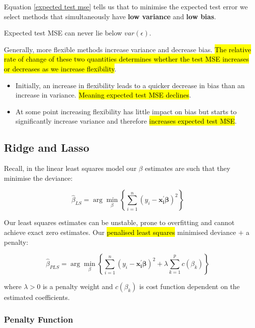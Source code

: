 \documentclass[11pt]{article}
\begin{document}
Equation \eqref{expected test mse} tells us that to minimise the expected test error we select methods that simultaneously have \textbf{low variance} and \textbf{low bias}.

\begin{note}
    Expected test MSE can never lie below $var(\epsilon)$.
\end{note}

Generally, more flexible methods increase variance and decrease bias. \hl{The relative rate of change of these two quantities determines whether the test MSE increases or decreases as we increase flexibility}.
\begin{itemize}
    \item Initially, an increase in flexibility leads to a quicker decrease in bias than an increase in variance. \hl{Meaning expected test MSE declines}.
    \item At some point increasing flexibility has little impact on bias but starts to significantly increase variance and therefore \hl{increases expected test MSE}.
\end{itemize}

\subsection{Ridge and Lasso}

Recall, in the linear least squares model our $\beta$ estimates are such that they minimise the deviance:

\begin{equation*}
    \hat{\beta}_{LS} = \arg \underset{\beta}{\min} \left\{\sum_{i=1}^n(y_i - \mathbf{x_i^\prime}\bm{\beta})^2\right\}
\end{equation*}

Our least squares estimates can be unstable, prone to overfitting and cannot achieve exact zero estimates. Our \hl{penalised least squares} minimised deviance $+$ a penalty:

\begin{equation}
    \label{eq:pls}
    \hat{\beta}_{PLS} = \arg\underset{\beta}{\min}\left\{\sum_{i=1}^n(y_i - \mathbf{x_i^\prime}\bm{\beta})^2 + \lambda\sum_{k=1}^p c(\beta_k)\right\}
\end{equation}

where $\lambda >0$ is a penalty weight and $c(\beta_k)$ is cost function dependent on the estimated coefficients.

\subsubsection{Penalty Function}
\end{document}
